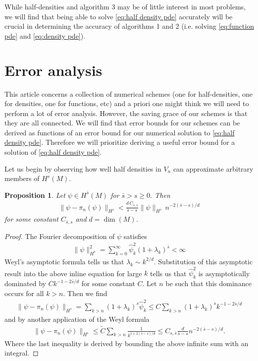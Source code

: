\documentclass[12pt]{amsart}
\newtheorem{prop}[thm]{Proposition}
\begin{document}
While half-densities and algorithm 3 may be of little interest in most problems,
we will find that being able to solve \eqref{eq:half density pde} accurately will be crucial in determining the accuracy of algorithms 1 and 2 (i.e. solving \eqref{eq:function pde} and \eqref{eq:density pde}).

\section{Error analysis}

This article concerns a collection of numerical schemes (one for half-densities, one for densities, one for functions, etc) and a priori one might think we will need to perform a lot of error analysis.
However, the saving grace of our schemes is that they are all connected.  We will find that error bounds for our schemes can be derived as functions of an error bound
for our numerical solution to \eqref{eq:half density pde}.  Therefore we will prioritize deriving a useful error bound for a solution
of \eqref{eq:half density pde}.

Let us begin by observing how well half densities in $V_{n}$ can approximate arbitrary members of $H^{s}(M)$.

\begin{prop} \label{prop:approximation}
	Let $\psi \in H^{\bar{s}}(M)$ for $\bar{s} > s \geq 0$.
	Then
	\begin{align}
		\| \psi - \pi_{n}(\psi) \|_{H^{s}} <  \frac{d \, C_{\bar{s},s} }{ \bar{s}-s} \| \psi \|_{H^{\bar{s}}} \, n^{-2(\bar{s}-s)/d}
	\end{align}
	for some constant $C_{\bar{s},s}$ and $d = \dim(M)$.
\end{prop}
\begin{proof}
	The Fourier decomposition of $\psi$ satisfies
	\begin{align}
		\| \psi \|^{2}_{H^{\bar{s} }} = \sum_{k=0}^{\infty} \hat{\psi}_{k}^{2} (1+\lambda_{k})^{\bar{s}} < \infty
	\end{align}
	Weyl's asymptotic formula tells us that $\lambda_{k} \sim k^{2/d}$.
	Substitution of this asymptotic result into the above inline equation for large $k$ tells us that $\hat{\psi}_{k}^{2}$ is asymptotically dominated by  $C k^{-1- 2\bar{s}/d}$
	for some constant $C$.
	Let $n$ be such that this dominance occurs for all $k>n$.  Then we find
	\begin{align}
		\| \psi - \pi_{n}(\psi) \|_{H^{s}} = \sum_{k>n} (1+\lambda_{k})^{s} \hat{\psi}_{k}^{2} \leq C \sum_{k>n} (1+\lambda_{k})^{s} k^{-1- 2\bar{s}/d}
	\end{align}
	and by another application of the Weyl formula
	\begin{align}
		\| \psi - \pi_{n}(\psi) \|_{H^{s}} \leq \tilde{C} \sum_{k>n} \frac{1}{k^{1+2(\bar{s}-s)/d}} \leq C_{s,\bar{s}}  \frac{d }{ \bar{s}-s} n^{-2(\bar{s}-s)/d}.
	\end{align}
	Where the last inequality is derived by bounding the above infinite sum with an integral.
\end{proof}
\end{document}
